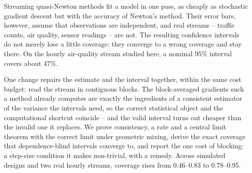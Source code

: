 Streaming quasi-Newton methods fit a model in one pass, as cheaply as stochastic gradient descent
but with the accuracy of Newton's method. Their error bars, however, assume that observations are
independent, and real streams -- traffic counts, air quality, sensor readings -- are not. The
resulting confidence intervals do not merely lose a little coverage: they converge to a wrong
coverage and stay there. On the hourly air-quality stream studied here, a nominal 95\% interval
covers about 47\%.

One change repairs the estimate and the interval together, within the same cost budget: read the
stream in contiguous blocks. The block-averaged gradients such a method already computes are
exactly the ingredients of a consistent estimator of the variance the intervals need, so the
correct statistical object and the computational shortcut coincide -- and the valid interval turns
out cheaper than the invalid one it replaces. We prove consistency, a rate and a central limit
theorem with the correct limit under geometric mixing, derive the exact coverage that
dependence-blind intervals converge to, and report the one cost of blocking: a step-size condition
it makes non-trivial, with a remedy. Across simulated designs and two real hourly streams,
coverage rises from 0.46--0.83 to 0.78--0.95.
